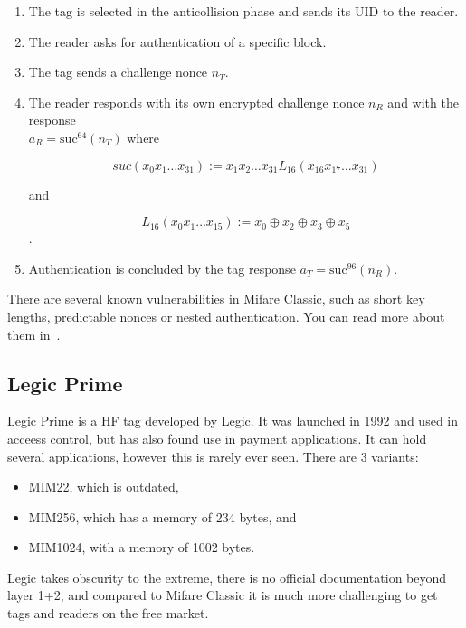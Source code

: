 \begin{enumerate}
    \item The tag is selected in the anticollision phase and sends its UID to the reader.
    \item The reader asks for authentication of a specific block.
    \item The tag sends a challenge nonce \( n_{T} \).
    \item The reader responds with its own encrypted challenge nonce \( n_{R} \) and with the response\\
    \(
        a_{R} = \text{suc}^{64}(n_{T})
    \) where

    \begin{equation*}
        suc(x_0 x_1 \ldots x_{31}) := x_1 x_2 \ldots x_{31} L_{16}(x_{16} x_{17} \ldots x_{31})
    \end{equation*}


    and

    \begin{equation*}
        L_{16}(x_0x_1 \ldots x_{15}) := x_0 \oplus x_2 \oplus x_3 \oplus x_5
    \end{equation*}.


\item Authentication is concluded by the tag response \( a_{T} = \text{suc}^{96}(n_{R}) \).~\cite{tezcan2017brute}
\end{enumerate}

 There are several known vulnerabilities in Mifare Classic, such as short key lengths, predictable nonces or nested authentication. You can read more about them in~\cite{meijer2015mifare}.


\subsection{Legic Prime}

Legic Prime is a HF tag developed by Legic. It was launched in 1992 and used in acceess control, but has also found use in payment applications. It can hold several applications, however this is rarely ever seen. There are 3 variants:

\begin{itemize}
    \item MIM22, which is outdated,
    \item MIM256, which has a memory of 234 bytes, and
    \item MIM1024, with a memory of 1002 bytes.
\end{itemize}
Legic takes obscurity to the extreme, there is no official documentation beyond layer 1+2, and compared to Mifare Classic it is much more challenging to get tags and readers on the free market.~\cite{nohllegic}

